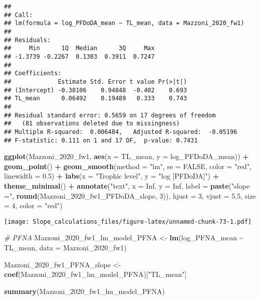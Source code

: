 \documentclass[
]{article}
\newenvironment{Shaded}{\begin{snugshade}}{\end{snugshade}}
\newcommand{\AttributeTok}[1]{\textcolor[rgb]{0.13,0.29,0.53}{#1}}
\newcommand{\CommentTok}[1]{\textcolor[rgb]{0.56,0.35,0.01}{\textit{#1}}}
\newcommand{\ConstantTok}[1]{\textcolor[rgb]{0.56,0.35,0.01}{#1}}
\newcommand{\DecValTok}[1]{\textcolor[rgb]{0.00,0.00,0.81}{#1}}
\newcommand{\FloatTok}[1]{\textcolor[rgb]{0.00,0.00,0.81}{#1}}
\newcommand{\FunctionTok}[1]{\textcolor[rgb]{0.13,0.29,0.53}{\textbf{#1}}}
\newcommand{\NormalTok}[1]{#1}
\newcommand{\OtherTok}[1]{\textcolor[rgb]{0.56,0.35,0.01}{#1}}
\newcommand{\SpecialCharTok}[1]{\textcolor[rgb]{0.81,0.36,0.00}{\textbf{#1}}}
\newcommand{\StringTok}[1]{\textcolor[rgb]{0.31,0.60,0.02}{#1}}
\begin{document}
\begin{verbatim}
## 
## Call:
## lm(formula = log_PFDoDA_mean ~ TL_mean, data = Mazzoni_2020_fw1)
## 
## Residuals:
##     Min      1Q  Median      3Q     Max 
## -1.3739 -0.2267  0.1303  0.3911  0.7247 
## 
## Coefficients:
##             Estimate Std. Error t value Pr(>|t|)
## (Intercept) -0.38106    0.94848  -0.402    0.693
## TL_mean      0.06492    0.19489   0.333    0.743
## 
## Residual standard error: 0.5659 on 17 degrees of freedom
##   (81 observations deleted due to missingness)
## Multiple R-squared:  0.006484,   Adjusted R-squared:  -0.05196 
## F-statistic: 0.111 on 1 and 17 DF,  p-value: 0.7431
\end{verbatim}

\begin{Shaded}
\begin{Highlighting}[]
\FunctionTok{ggplot}\NormalTok{(Mazzoni\_2020\_fw1, }\FunctionTok{aes}\NormalTok{(}\AttributeTok{x =}\NormalTok{ TL\_mean, }\AttributeTok{y =}\NormalTok{ log\_PFDoDA\_mean)) }\SpecialCharTok{+}
  \FunctionTok{geom\_point}\NormalTok{() }\SpecialCharTok{+}
  \FunctionTok{geom\_smooth}\NormalTok{(}\AttributeTok{method =} \StringTok{"lm"}\NormalTok{, }\AttributeTok{se =} \ConstantTok{FALSE}\NormalTok{, }\AttributeTok{color =} \StringTok{"red"}\NormalTok{, }\AttributeTok{linewidth =} \FloatTok{0.5}\NormalTok{) }\SpecialCharTok{+}
  \FunctionTok{labs}\NormalTok{(}\AttributeTok{x =} \StringTok{"Trophic level"}\NormalTok{,}
       \AttributeTok{y =} \StringTok{"log [PFDoDA]"}\NormalTok{) }\SpecialCharTok{+}
  \FunctionTok{theme\_minimal}\NormalTok{() }\SpecialCharTok{+}
  \FunctionTok{annotate}\NormalTok{(}\StringTok{"text"}\NormalTok{, }\AttributeTok{x =} \ConstantTok{Inf}\NormalTok{, }\AttributeTok{y =} \ConstantTok{Inf}\NormalTok{, }\AttributeTok{label =} \FunctionTok{paste}\NormalTok{(}\StringTok{"slope ="}\NormalTok{, }\FunctionTok{round}\NormalTok{(Mazzoni\_2020\_fw1\_PFDoDA\_slope, }\DecValTok{3}\NormalTok{)), }
           \AttributeTok{hjust =} \DecValTok{3}\NormalTok{, }\AttributeTok{vjust =} \FloatTok{5.5}\NormalTok{, }\AttributeTok{size =} \DecValTok{4}\NormalTok{, }\AttributeTok{color =} \StringTok{"red"}\NormalTok{)}
\end{Highlighting}
\end{Shaded}

\texttt{[image: Slope\_calculations\_files/figure-latex/unnamed-chunk-73-1.pdf]}

\begin{Shaded}
\begin{Highlighting}[]
\CommentTok{\# PFNA}
\NormalTok{Mazzoni\_2020\_fw1\_lm\_model\_PFNA }\OtherTok{\textless{}{-}} \FunctionTok{lm}\NormalTok{(log\_PFNA\_mean }\SpecialCharTok{\textasciitilde{}}\NormalTok{ TL\_mean,}
                                      \AttributeTok{data =}\NormalTok{ Mazzoni\_2020\_fw1)}

\NormalTok{Mazzoni\_2020\_fw1\_PFNA\_slope }\OtherTok{\textless{}{-}} \FunctionTok{coef}\NormalTok{(Mazzoni\_2020\_fw1\_lm\_model\_PFNA)[}\StringTok{"TL\_mean"}\NormalTok{]}

\FunctionTok{summary}\NormalTok{(Mazzoni\_2020\_fw1\_lm\_model\_PFNA)}
\end{Highlighting}
\end{Shaded}
\end{document}
